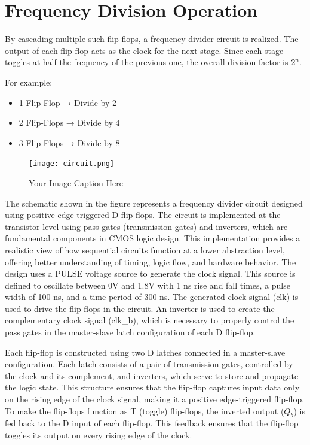 \section*{Frequency Division Operation}
By cascading multiple such flip-flops, a frequency divider circuit is realized. The output of each flip-flop acts as the clock for the next stage. Since each stage toggles at half the frequency of the previous one, the overall division factor is \(2^n\).

For example:
\begin{itemize}
    \item 1 Flip-Flop → Divide by 2
    \item 2 Flip-Flops → Divide by 4
    \item 3 Flip-Flops → Divide by 8
\end{itemize}
\begin{figure}[H] %
    \centering
    \texttt{[image: circuit.png]}
    \caption{Your Image Caption Here}
    \label{fig:LT Spice Circuit}
\end{figure}

The schematic shown in the figure represents a frequency divider circuit designed using positive edge-triggered D flip-flops. The circuit is implemented at the transistor level using pass gates (transmission gates) and inverters, which are fundamental components in CMOS logic design. This implementation provides a realistic view of how sequential circuits function at a lower abstraction level, offering better understanding of timing, logic flow, and hardware behavior.
The design uses a PULSE voltage source to generate the clock signal. This source is defined to oscillate between 0V and 1.8V with 1 ns rise and fall times, a pulse width of 100 ns, and a time period of 300 ns. The generated clock signal (clk) is used to drive the flip-flops in the circuit. An inverter is used to create the complementary clock signal (clk\_b), which is necessary to properly control the pass gates in the master-slave latch configuration of each D flip-flop.

Each flip-flop is constructed using two D latches connected in a master-slave configuration. Each latch consists of a pair of transmission gates, controlled by the clock and its complement, and inverters, which serve to store and propagate the logic state. This structure ensures that the flip-flop captures input data only on the rising edge of the clock signal, making it a positive edge-triggered flip-flop. To make the flip-flops function as T (toggle) flip-flops, the inverted output (\(Q_b\)) is fed back to the D input of each flip-flop. This feedback ensures that the flip-flop toggles its output on every rising edge of the clock.

